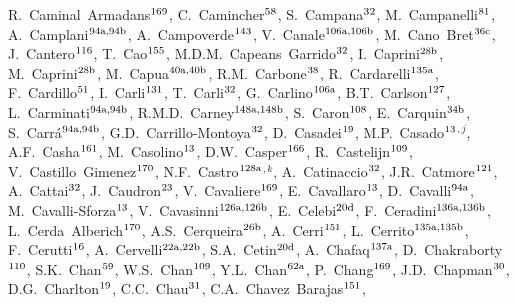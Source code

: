 \begin{flushleft}
R.~Caminal~Armadans$^\textrm{\scriptsize 169}$,
C.~Camincher$^\textrm{\scriptsize 58}$,
S.~Campana$^\textrm{\scriptsize 32}$,
M.~Campanelli$^\textrm{\scriptsize 81}$,
A.~Camplani$^\textrm{\scriptsize 94a,94b}$,
A.~Campoverde$^\textrm{\scriptsize 143}$,
V.~Canale$^\textrm{\scriptsize 106a,106b}$,
M.~Cano~Bret$^\textrm{\scriptsize 36c}$,
J.~Cantero$^\textrm{\scriptsize 116}$,
T.~Cao$^\textrm{\scriptsize 155}$,
M.D.M.~Capeans~Garrido$^\textrm{\scriptsize 32}$,
I.~Caprini$^\textrm{\scriptsize 28b}$,
M.~Caprini$^\textrm{\scriptsize 28b}$,
M.~Capua$^\textrm{\scriptsize 40a,40b}$,
R.M.~Carbone$^\textrm{\scriptsize 38}$,
R.~Cardarelli$^\textrm{\scriptsize 135a}$,
F.~Cardillo$^\textrm{\scriptsize 51}$,
I.~Carli$^\textrm{\scriptsize 131}$,
T.~Carli$^\textrm{\scriptsize 32}$,
G.~Carlino$^\textrm{\scriptsize 106a}$,
B.T.~Carlson$^\textrm{\scriptsize 127}$,
L.~Carminati$^\textrm{\scriptsize 94a,94b}$,
R.M.D.~Carney$^\textrm{\scriptsize 148a,148b}$,
S.~Caron$^\textrm{\scriptsize 108}$,
E.~Carquin$^\textrm{\scriptsize 34b}$,
S.~Carr\'a$^\textrm{\scriptsize 94a,94b}$,
G.D.~Carrillo-Montoya$^\textrm{\scriptsize 32}$,
D.~Casadei$^\textrm{\scriptsize 19}$,
M.P.~Casado$^\textrm{\scriptsize 13}$$^{,j}$,
A.F.~Casha$^\textrm{\scriptsize 161}$,
M.~Casolino$^\textrm{\scriptsize 13}$,
D.W.~Casper$^\textrm{\scriptsize 166}$,
R.~Castelijn$^\textrm{\scriptsize 109}$,
V.~Castillo~Gimenez$^\textrm{\scriptsize 170}$,
N.F.~Castro$^\textrm{\scriptsize 128a}$$^{,k}$,
A.~Catinaccio$^\textrm{\scriptsize 32}$,
J.R.~Catmore$^\textrm{\scriptsize 121}$,
A.~Cattai$^\textrm{\scriptsize 32}$,
J.~Caudron$^\textrm{\scriptsize 23}$,
V.~Cavaliere$^\textrm{\scriptsize 169}$,
E.~Cavallaro$^\textrm{\scriptsize 13}$,
D.~Cavalli$^\textrm{\scriptsize 94a}$,
M.~Cavalli-Sforza$^\textrm{\scriptsize 13}$,
V.~Cavasinni$^\textrm{\scriptsize 126a,126b}$,
E.~Celebi$^\textrm{\scriptsize 20d}$,
F.~Ceradini$^\textrm{\scriptsize 136a,136b}$,
L.~Cerda~Alberich$^\textrm{\scriptsize 170}$,
A.S.~Cerqueira$^\textrm{\scriptsize 26b}$,
A.~Cerri$^\textrm{\scriptsize 151}$,
L.~Cerrito$^\textrm{\scriptsize 135a,135b}$,
F.~Cerutti$^\textrm{\scriptsize 16}$,
A.~Cervelli$^\textrm{\scriptsize 22a,22b}$,
S.A.~Cetin$^\textrm{\scriptsize 20d}$,
A.~Chafaq$^\textrm{\scriptsize 137a}$,
D.~Chakraborty$^\textrm{\scriptsize 110}$,
S.K.~Chan$^\textrm{\scriptsize 59}$,
W.S.~Chan$^\textrm{\scriptsize 109}$,
Y.L.~Chan$^\textrm{\scriptsize 62a}$,
P.~Chang$^\textrm{\scriptsize 169}$,
J.D.~Chapman$^\textrm{\scriptsize 30}$,
D.G.~Charlton$^\textrm{\scriptsize 19}$,
C.C.~Chau$^\textrm{\scriptsize 31}$,
C.A.~Chavez~Barajas$^\textrm{\scriptsize 151}$,

\end{flushleft}

